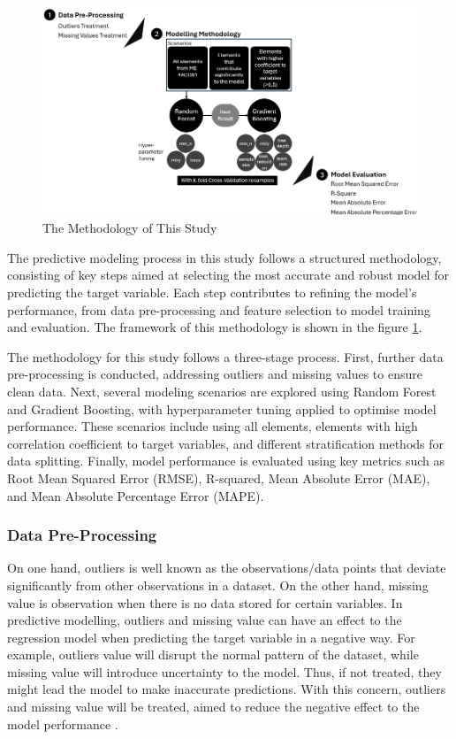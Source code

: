 \documentclass[11pt,a4paper,]{article}
\begin{document}
\begin{figure}

{\centering \includegraphics[width=0.95\linewidth]{./Final_report_files/figure-latex/Methodologyv2} 

}

\caption{The Methodology of This Study}\label{fig:modelbuilding}
\end{figure}

The predictive modeling process in this study follows a structured methodology, consisting of key steps aimed at selecting the most accurate and robust model for predicting the target variable. Each step contributes to refining the model's performance, from data pre-processing and feature selection to model training and evaluation. The framework of this methodology is shown in the figure \ref{fig:modelbuilding}.

The methodology for this study follows a three-stage process. First, further data pre-processing is conducted, addressing outliers and missing values to ensure clean data. Next, several modeling scenarios are explored using Random Forest and Gradient Boosting, with hyperparameter tuning applied to optimise model performance. These scenarios include using all elements, elements with high correlation coefficient to target variables, and different stratification methods for data splitting. Finally, model performance is evaluated using key metrics such as Root Mean Squared Error (RMSE), R-squared, Mean Absolute Error (MAE), and Mean Absolute Percentage Error (MAPE).

\subsubsection{Data Pre-Processing}\label{data-pre-processing}

On one hand, outliers is well known as the observations/data points that deviate significantly from other observations in a dataset. On the other hand, missing value is observation when there is no data stored for certain variables. In predictive modelling, outliers and missing value can have an effect to the regression model when predicting the target variable in a negative way. For example, outliers value will disrupt the normal pattern of the dataset, while missing value will introduce uncertainty to the model. Thus, if not treated, they might lead the model to make inaccurate predictions. With this concern, outliers and missing value will be treated, aimed to reduce the negative effect to the model performance \autocite{Hastie09}.
\end{document}
